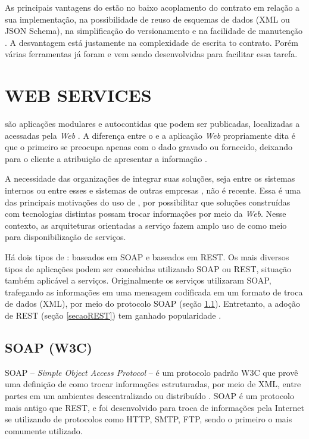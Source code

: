 As principais vantagens do \CtFirst{} estão no baixo acoplamento do contrato em
relação a sua implementação, na possibilidade de reuso de esquemas de dados (XML
ou JSON Schema), na simplificação do versionamento e na facilidade de manutenção
\cite{karthikeyancontract}. A desvantagem está justamente na complexidade de
escrita to contrato. Porém várias ferramentas já foram e vem sendo desenvolvidas
para facilitar essa tarefa.


\section{WEB SERVICES}
\vspace{-6mm}

\ws{} são aplicações modulares e autocontidas que podem ser publicadas,
localizadas a acessadas pela \textit{Web} \cite{alonso2004web}. A diferença
entre o \ws{} e a aplicação \textit{Web} propriamente dita é que o primeiro se
preocupa apenas com o dado gravado ou fornecido, deixando para o cliente a atribuição de apresentar a
informação \cite{serrano2014service}.

A necessidade das organizações de integrar suas soluções, seja
entre os sistemas internos ou entre esses e sistemas de outras empresas
\cite{rao2004survey}, não é recente. Essa é uma das principais motivações do uso
de \ws{}, por possibilitar que soluções construídas com tecnologias distintas
possam trocar informações por meio da \textit{Web}. Nesse contexto, as arquiteturas
orientadas a serviço fazem amplo uso de \ws{} como meio para disponibilização de serviços.

Há dois tipos de \ws{}: baseados em SOAP e baseados em REST. Os mais diversos
tipos de aplicações podem ser concebidas utilizando \wss{} SOAP ou REST,
situação também aplicável a serviços.
Originalmente os serviços utilizaram \ws{} SOAP, trafegando as informações em
uma mensagem codificada em um formato de troca de dados (XML), por meio do
protocolo SOAP (seção \ref{secaoSOAP}). Entretanto, a adoção de \ws{} REST
(seção \ref{secaoREST}) tem ganhado popularidade \cite{mumbaikar2013web}.

\subsection{SOAP (W3C) }
\label{secaoSOAP}
\vspace{-6mm}

SOAP -- \textit{Simple Object Access Protocol} -- é um protocolo padrão W3C que
provê uma definição de como trocar informações estruturadas, por meio de XML, entre
partes em um ambientes descentralizado ou distribuído \cite{WSDLSite}. SOAP é um
protocolo mais antigo que REST, e foi desenvolvido para troca de informações
pela Internet se utilizando de protocolos como HTTP, SMTP, FTP, sendo o primeiro
o mais comumente utilizado.

